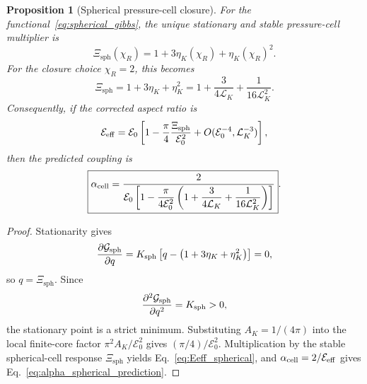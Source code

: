 \documentclass[aps,pra,preprint,longbibliography,nofootinbib]{revtex4-2}
\newtheorem{proposition}{Proposition}
\newcommand{\Et}{\mathcal{E}_0}                    %
\newcommand{\LK}{\mathcal{L}_K}                     %
\newcommand{\AK}{A_K}                                %
\newcommand{\Xsph}{\Xi_{\mathrm{sph}}}             %
\newcommand{\chiR}{\chi_R}                         %
\begin{document}
\begin{proposition}[Spherical pressure-cell closure]
\label{prop:spherical_alpha}
For the functional~\eqref{eq:spherical_gibbs}, the unique stationary and
stable pressure-cell multiplier is
\begin{equation}
  \Xsph(\chiR)=1+3\eta_K(\chiR)+\eta_K(\chiR)^2 .
  \label{eq:Xi_sph_general_main}
\end{equation}
For the closure choice $\chiR=2$, this becomes
\begin{equation}
  \Xsph=1+3\eta_K+\eta_K^2
       =1+\frac{3}{4\LK}+\frac{1}{16\LK^2}.
  \label{eq:Xi_sph}
\end{equation}
Consequently, if the corrected aspect ratio is
\begin{equation}
  \mathcal E_{\rm eff}
  =\Et\left[1-\frac{\pi}{4}\frac{\Xsph}{\Et^2}
       +O(\Et^{-4},\LK^{-3})\right],
  \label{eq:Eeff_spherical}
\end{equation}
then the predicted coupling is
\begin{equation}
  \boxed{
  \alpha_{\rm cell}
  =\frac{2}{\Et\left[1-\dfrac{\pi}{4\Et^2}
      \left(1+\dfrac{3}{4\LK}+\dfrac{1}{16\LK^2}\right)\right]}
  } .
  \label{eq:alpha_spherical_prediction}
\end{equation}
\end{proposition}

\begin{proof}
Stationarity gives
\begin{equation}
  \frac{\partial \mathcal G_{\rm sph}}{\partial q}
  =K_{\rm sph}\left[q-\left(1+3\eta_K+\eta_K^2\right)\right]=0,
  \label{eq:gibbs_stationarity}
\end{equation}
so $q=\Xsph$.  Since
\begin{equation}
  \frac{\partial^2 \mathcal G_{\rm sph}}{\partial q^2}=K_{\rm sph}>0,
  \label{eq:gibbs_stability}
\end{equation}
the stationary point is a strict minimum.  Substituting
$\AK=1/(4\pi)$ into the local finite-core factor $\pi^2\AK/\Et^2$ gives
$(\pi/4)/\Et^2$.  Multiplication by the stable spherical-cell response
$\Xsph$ yields Eq.~\eqref{eq:Eeff_spherical}, and
$\alpha_{\rm cell}=2/\mathcal E_{\rm eff}$ gives
Eq.~\eqref{eq:alpha_spherical_prediction}.
\end{proof}
\end{document}
